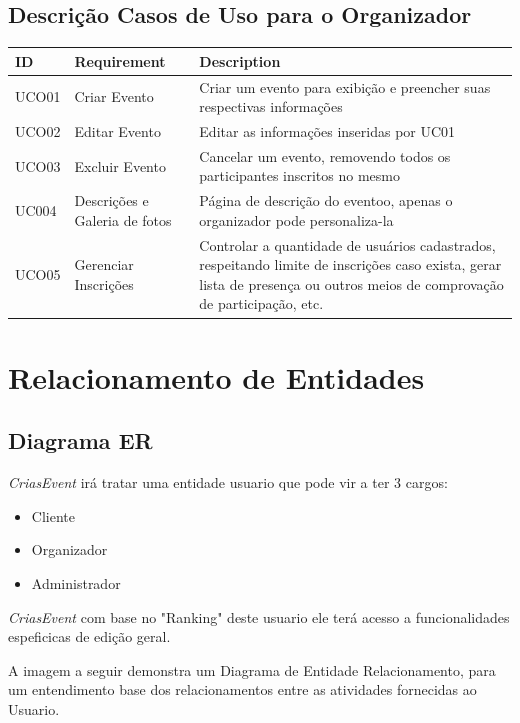 \section{Descrição Casos de Uso para o Organizador}
\begin{tabular}{>{\raggedright}p{1.5cm}>{\raggedright}p{4cm}>{\raggedright}p{10cm}}
\toprule
\textbf{ID} & \textbf{Requirement} & \textbf{Description} \tabularnewline 
\midrule
  UCO01 & Criar Evento & Criar um evento para exibição e preencher suas respectivas informações \tabularnewline \hline
  UCO02 & Editar Evento & Editar as informações inseridas por UC01\tabularnewline \hline
  UCO03 & Excluir Evento & Cancelar um evento, removendo todos os participantes inscritos no mesmo\tabularnewline \hline
  UC004 & Descrições e Galeria de fotos & Página de descrição do eventoo, apenas o organizador pode personaliza-la\tabularnewline \hline
  UCO05 & Gerenciar Inscrições & Controlar a quantidade de usuários cadastrados, respeitando limite de inscrições caso exista, gerar lista de presença ou outros meios de comprovação de participação, etc. \tabularnewline 
\bottomrule
\end{tabular}

\chapter{Relacionamento de Entidades}

\section{Diagrama ER}
\textit{CriasEvent} irá tratar uma entidade usuario que pode vir a ter 3 cargos:
\begin{itemize}
    \item Cliente
    \item Organizador
    \item Administrador
\end{itemize}
\textit{CriasEvent} com base no "Ranking" deste usuario ele terá acesso a funcionalidades espeficicas de edição geral. \par
A imagem a seguir demonstra um Diagrama de Entidade Relacionamento, para um entendimento base dos relacionamentos entre as atividades fornecidas ao Usuario.

